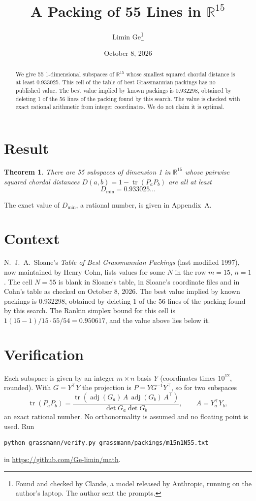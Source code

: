 \documentclass[11pt,a4paper]{article}
\title{A Packing of 55 Lines in $\mathbb{R}^{15}$}
\author{Limin Ge\thanks{Found and checked by Claude, a model released by Anthropic, running on the author's laptop. The author sent the prompts.}}
\date{October 8, 2026}
\newtheorem*{theorem}{Theorem}
\begin{document}
\maketitle
\begin{abstract}
We give 55 1-dimensional subspaces of $\mathbb{R}^{15}$ whose smallest squared chordal distance is at least 0.933025. This cell of the table of best Grassmannian packings has no published value. The best value implied by known packings is 0.932298, obtained by deleting 1 of the 56 lines of the packing found by this search. The value is checked with exact rational arithmetic from integer coordinates. We do not claim it is optimal.
\end{abstract}

\section{Result}
\begin{theorem}
There are 55 subspaces of dimension 1 in $\mathbb{R}^{15}$ whose pairwise squared chordal distances $D(a,b) = 1 - \operatorname{tr}(P_aP_b)$ are all at least
\[ D_{\min} = 0.933025\ldots \]
\end{theorem}
The exact value of $D_{\min}$, a rational number, is given in Appendix~A.


\section{Context}
N.~J.~A.~Sloane's \emph{Table of Best Grassmannian Packings} (last modified 1997), now maintained by Henry Cohn, lists values for some $N$ in the row $m=15$, $n=1$. The cell $N=55$ is blank in Sloane's table, in Sloane's coordinate files and in Cohn's table as checked on October 8, 2026. The best value implied by known packings is 0.932298, obtained by deleting 1 of the 56 lines of the packing found by this search. The Rankin simplex bound for this cell is $1(15-1)/15\cdot 55/54 = 0.950617$, and the value above lies below it.


\section{Verification}
Each subspace is given by an integer $m\times n$ basis $Y$ (coordinates times $10^{12}$, rounded). With $G=Y^\top Y$ the projection is $P=YG^{-1}Y^\top$, so for two subspaces
\[ \operatorname{tr}(P_aP_b)=\frac{\operatorname{tr}(\operatorname{adj}(G_a)\,A\,\operatorname{adj}(G_b)\,A^\top)}{\det G_a\det G_b},\qquad A=Y_a^\top Y_b, \]
an exact rational number. No orthonormality is assumed and no floating point is used. Run
\begin{verbatim}
python grassmann/verify.py grassmann/packings/m15n1N55.txt
\end{verbatim}
in \url{https://github.com/Ge-limin/math}.
\end{document}
